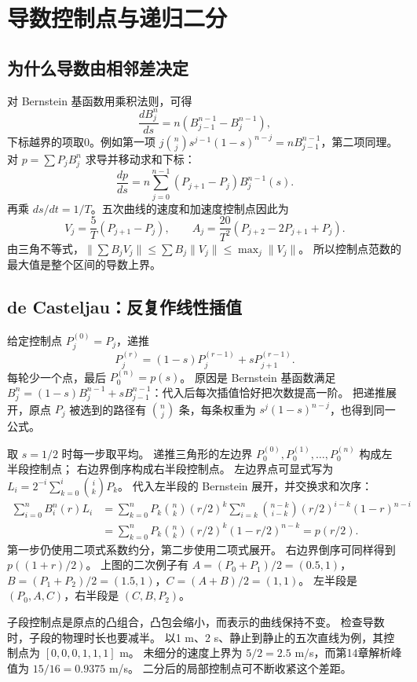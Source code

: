 \clearpage
\section{导数控制点与递归二分}
\subsection{为什么导数由相邻差决定}
对 Bernstein 基函数用乘积法则，可得
\[
 \frac{dB_j^n}{ds}=n(B_{j-1}^{n-1}-B_j^{n-1}),
\]
下标越界的项取0。例如第一项 $j\binom nj s^{j-1}(1-s)^{n-j}=nB_{j-1}^{n-1}$，第二项同理。
对 $p=\sum P_jB_j^n$ 求导并移动求和下标：
\[
 \frac{dp}{ds}=n\sum_{j=0}^{n-1}(P_{j+1}-P_j)B_j^{n-1}(s).
\]
再乘 $ds/dt=1/T$。五次曲线的速度和加速度控制点因此为
\begin{equation}
 V_j=\frac5T(P_{j+1}-P_j),\qquad
 A_j=\frac{20}{T^2}(P_{j+2}-2P_{j+1}+P_j).
\end{equation}
由三角不等式，$\|\sum B_jV_j\|\le\sum B_j\|V_j\|\le\max_j\|V_j\|$。
所以控制点范数的最大值是整个区间的导数上界。

\subsection{de Casteljau：反复作线性插值}
给定控制点 $P_j^{(0)}=P_j$，递推
\[
 P_j^{(r)}=(1-s)P_j^{(r-1)}+sP_{j+1}^{(r-1)}.
\]
每轮少一个点，最后 $P_0^{(n)}=p(s)$。
原因是 Bernstein 基函数满足
$B_j^n=(1-s)B_j^{n-1}+sB_{j-1}^{n-1}$：代入后每次插值恰好把次数提高一阶。
把递推展开，原点 $P_j$ 被选到的路径有 $\binom nj$ 条，每条权重为 $s^j(1-s)^{n-j}$，也得到同一公式。

取 $s=1/2$ 时每一步取平均。
递推三角形的左边界 $P_0^{(0)},P_0^{(1)},\ldots,P_0^{(n)}$ 构成左半段控制点；
右边界倒序构成右半段控制点。
左边界点可显式写为 $L_i=2^{-i}\sum_{k=0}^i\binom ikP_k$。
代入左半段的 Bernstein 展开，并交换求和次序：
\begin{align*}
 \sum_{i=0}^n B_i^n(r)L_i
 &=\sum_{k=0}^nP_k\binom nk(r/2)^k
   \sum_{i=k}^n\binom{n-k}{i-k}(r/2)^{i-k}(1-r)^{n-i}\\
 &=\sum_{k=0}^nP_k\binom nk(r/2)^k(1-r/2)^{n-k}=p(r/2).
\end{align*}
第一步仍使用二项式系数约分，第二步使用二项式展开。
右边界倒序可同样得到 $p((1+r)/2)$。
上图的二次例子有
$A=(P_0+P_1)/2=(0.5,1)$，$B=(P_1+P_2)/2=(1.5,1)$，$C=(A+B)/2=(1,1)$。
左半段是 $(P_0,A,C)$，右半段是 $(C,B,P_2)$。

子段控制点是原点的凸组合，凸包会缩小，而表示的曲线保持不变。
检查导数时，子段的物理时长也要减半。
以1 m、2 s、静止到静止的五次直线为例，其控制点为 $[0,0,0,1,1,1]$ m。
未细分的速度上界为 $5/2=2.5$ m/s，而第14章解析峰值为 $15/16=0.9375$ m/s。
二分后的局部控制点可不断收紧这个差距。

